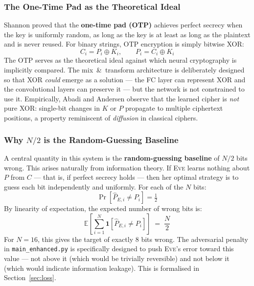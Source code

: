 \documentclass[12pt, a4paper]{article}
\newcommand{\eve}{\textsc{Eve}}
\newcommand{\code}[1]{\texttt{\color{CodeRed}#1}}
\begin{document}
\subsubsection*{The One-Time Pad as the Theoretical Ideal}

Shannon proved that the \textbf{one-time pad (OTP)} achieves perfect
secrecy when the key is uniformly random, as long as the key is at least
as long as the plaintext and is never reused. For binary strings, OTP
encryption is simply bitwise XOR:
%
\begin{equation}
  C_i = P_i \oplus K_i, \qquad
  P_i = C_i \oplus K_i
  \label{eq:otp}
\end{equation}
%
The OTP serves as the theoretical ideal against which neural cryptography
is implicitly compared. The mix~\&~transform architecture is deliberately
designed so that XOR \emph{could} emerge as a solution — the FC layer can
represent XOR and the convolutional layers can preserve it — but the
network is not constrained to use it. Empirically, Abadi and Andersen
observe that the learned cipher is \emph{not} pure XOR: single-bit
changes in $K$ or $P$ propagate to multiple ciphertext positions, a
property reminiscent of \emph{diffusion} in classical ciphers.

\subsubsection*{Why $N/2$ is the Random-Guessing Baseline}
\label{subsubsec:random_baseline}

A central quantity in this system is the \textbf{random-guessing baseline}
of $N/2$ bits wrong. This arises naturally from information theory. If
\eve{} learns nothing about $P$ from $C$ — that is, if perfect secrecy
holds — then her optimal strategy is to guess each bit independently and
uniformly. For each of the $N$ bits:
%
\begin{equation}
  \Pr[\hat{P}_{E,i} \neq P_i] = \tfrac{1}{2}
  \label{eq:bit_error}
\end{equation}
%
By linearity of expectation, the expected number of wrong bits is:
%
\begin{equation}
  \mathbb{E}\!\left[\sum_{i=1}^{N} \mathbf{1}[\hat{P}_{E,i} \neq P_i]\right]
  \;=\; \frac{N}{2}
  \label{eq:random_baseline}
\end{equation}
%
For $N = 16$, this gives the target of exactly $8$ bits wrong. The
adversarial penalty in \code{main\_enhanced.py} is specifically designed
to push \eve{}'s error toward this value — not above it (which would
be trivially reversible) and not below it (which would indicate information
leakage). This is formalised in Section~\ref{sec:loss}.
\end{document}
